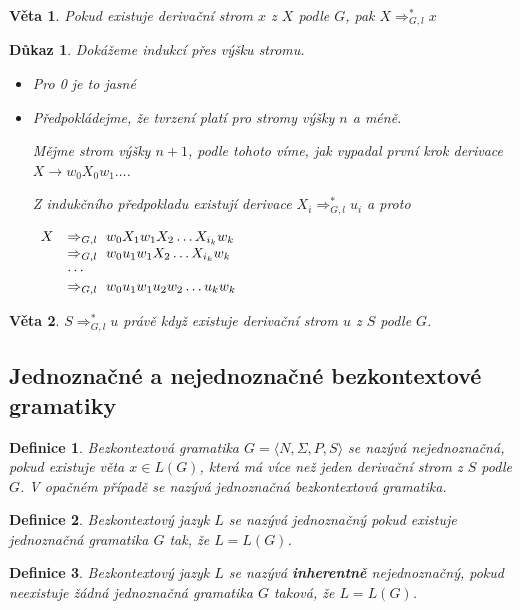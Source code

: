 \documentclass[10pt, a4paper, titlepage]{article}
\theoremstyle{note}
\newtheorem{veta}{\textbf{Věta}}
\newtheorem{definice}{\textbf{Definice}}
\newtheorem{dukaz}{\textbf{Důkaz}}
\begin{document}
\begin{veta}
Pokud existuje derivační strom $x$ z $X$ podle $G$, pak $X \Rightarrow_{G,l}^* x$
\end{veta}
\begin{dukaz}
Dokážeme indukcí přes výšku stromu.
\begin{itemize}
\item
Pro 0 je to jasné
\item
Předpokládejme, že tvrzení platí pro stromy výšky $n$ a méně.

Mějme strom výšky $n+1$, podle tohoto víme, jak vypadal první krok derivace $X \rightarrow w_0X_0w_1 \ldots$.

Z indukčního předpokladu existují derivace $X_i \Rightarrow_{G,l}^* u_i$ a proto

$
\begin{array}{l l}
X & \Rightarrow_{G,l}\  w_0X_1w_1X_2 \ldots X_{i_k}w_k \\
& \Rightarrow_{G,l}\  w_0u_1w_1X_2 \ldots X_{i_k}w_k \\
& \cdots \\
& \Rightarrow_{G,l}\  w_0u_1w_1u_2w_2 \ldots u_kw_k
\end{array}
$
\end{itemize}
\end{dukaz}

\begin{veta}
$S\Rightarrow_{G,l}^* u$ právě když existuje derivační strom $u$ z $S$ podle $G$.
\end{veta}

\subsection{Jednoznačné a nejednoznačné bezkontextové gramatiky}

\begin{definice}
Bezkontextová gramatika $G = \langle N,\Sigma,P,S \rangle$ se nazývá nejednoznačná, pokud existuje věta $x \in L(G)$, která má více než jeden derivační strom z $S$ podle $G$. V opačném případě se nazývá jednoznačná bezkontextová gramatika.
\end{definice}

\begin{definice}
Bezkontextový jazyk $L$ se nazývá jednoznačný pokud existuje jednoznačná gramatika $G$ tak, že $L=L(G)$.
\end{definice}

\begin{definice}
Bezkontextový jazyk $L$ se nazývá \textbf{inherentně} nejednoznačný, pokud neexistuje žádná jednoznačná gramatika $G$ taková, že $L=L(G)$.
\end{definice}
\end{document}
